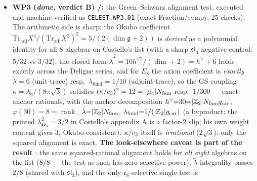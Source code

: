 \begin{itemize}
\vref{v510} that input reads: the square-modulus datum $\tau=i$; its position half is topology;
since \vref{v512} it reads equivalently: one discrete symmetry-lift bit, flag transitivity
$\iff\tau=i$; and since \vref{v521}/\vref{v525}/\vref{v529} free OS positivity, the whole
mark-decorated free-plus-twist state class and the first genuinely interacting FK toy are
documented as the \emph{eighth}, \emph{ninth} and \emph{tenth} side-blind tests --- the bit is
not derivable from free RP/$\Theta$ existence, from any Wick-computable twist decoration or from
the FK interaction class, and remains genuine discrete input; since \vref{v528} it is the
twist-class choice, in principle interferometrically readable; and since \vref{v534} it carries
the first \emph{positive} selection datum --- reflection positivity on the interacting mark
family keeps exactly the $\delta=\pi/2$ member alive, toy-fenced).
\item \textbf{WP3 (\emph{done}, verdict B) \mE/\mC:} the Green--Schwarz alignment test, executed and
machine-verified as \texttt{CELEST.WP3.01}  (exact
Fraction/sympy, $25$ checks). The arithmetic side is sharp: the Okubo coefficient
$\mathrm{Tr}_{\mathrm{adj}}X^4/(\mathrm{Tr}_{\mathrm{adj}}X^2)^2=5/(2(\dim\mathfrak g{+}2))$ is
\emph{derived} as a polynomial identity for all $8$ algebras on Costello's list (with a sharp
$\mathfrak{sl}_4$ negative control: $5/32$ vs $3/32$), the closed form
$\tilde\lambda^2=10h^{\vee2}/(\dim{+}2)=h^\vee{+}6$ holds exactly across the Deligne series, and for $E_8$
the axion coefficient is \emph{exactly} $\tilde\lambda=6$ (unit-trace) resp.\
$\lambda_{\mathrm{fund}}=1/10$ (adjoint-trace), so the GS coupling
$\kappa=\lambda_{\mathfrak g}/(8\pi\sqrt3)$ satisfies $(\kappa/c_3)^2=12=|\mu_4|N_{\mathrm{fam}}$ resp.\ $1/300$
--- exact anchor rationals, with the anchor decomposition $h^\vee{=}30{=}|\mathbb Z_2|N_{\mathrm{fam}}g_{\mathrm{car}}$,
$\varphi(30){=}8{=}\operatorname{rank}$, $\tilde\lambda{=}|\mathbb Z_2|N_{\mathrm{fam}}$,
$\lambda_{\mathrm{fund}}{=}1/(|\mathbb Z_2|g_{\mathrm{car}})$ (a byproduct: the printed $\lambda^2_{\mathfrak{so}_8}=3/2$
in Costello's appendix A is a factor-$2$ slip; his own weight content gives $3$, Okubo-consistent).
$\kappa/c_3$ itself is \emph{irrational} ($2\sqrt3$): only the squared alignment is exact. \textbf{The
look-elsewhere caveat is part of the result} \mC: the same squared-rational alignment holds for \emph{all
eight} algebras on the list ($8/8$ --- the test as such has zero selective power), $\tilde\lambda$-integrality
passes $2/8$ (shared with $\mathfrak{sl}_3$), and the only $\mathfrak e_8$-selective single test is

\end{itemize}
